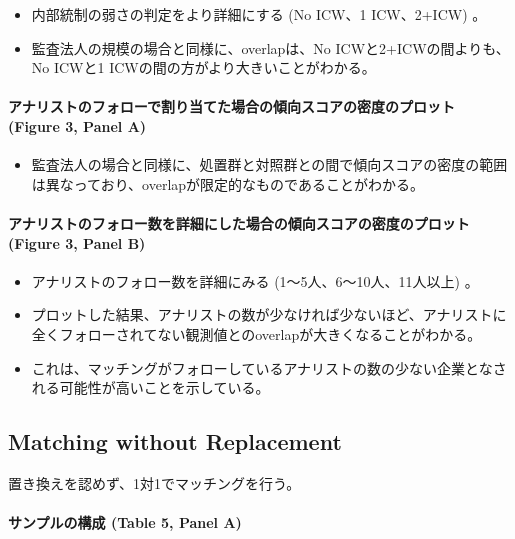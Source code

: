 \begin{itemize}
 \item 内部統制の弱さの判定をより詳細にする (No ICW、1 ICW、2+ICW) 。
 \item 監査法人の規模の場合と同様に、overlapは、No ICWと2+ICWの間よりも、No ICWと1 ICWの間の方がより大きいことがわかる。
\end{itemize}

\paragraph{アナリストのフォローで割り当てた場合の傾向スコアの密度のプロット (Figure 3, Panel A) }

\begin{itemize}
 \item 監査法人の場合と同様に、処置群と対照群との間で傾向スコアの密度の範囲は異なっており、overlapが限定的なものであることがわかる。
\end{itemize}

\paragraph{アナリストのフォロー数を詳細にした場合の傾向スコアの密度のプロット (Figure 3, Panel B) }

\begin{itemize}
 \item アナリストのフォロー数を詳細にみる (1〜5人、6〜10人、11人以上) 。
 \item プロットした結果、アナリストの数が少なければ少ないほど、アナリストに全くフォローされてない観測値とのoverlapが大きくなることがわかる。
 \item これは、マッチングがフォローしているアナリストの数の少ない企業となされる可能性が高いことを示している。
\end{itemize}

\subsection*{Matching without Replacement}

置き換えを認めず、1対1でマッチングを行う。

\paragraph{サンプルの構成 (Table 5, Panel A) }

